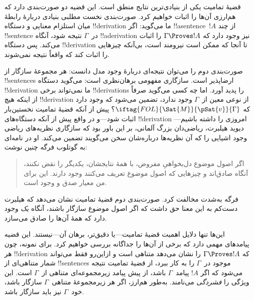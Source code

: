 \documentclass[../../../include/open-logic-section]{subfiles}
\begin{document}
      {}
      {}


قضیهٔ تمامیت یکی از بنیادی‌ترین نتایج منطق است. این قضیه دو صورت‌بندی
دارد که هم‌ارزی آن‌ها را اثبات خواهیم کرد. صورت‌بندی نخست مطلبی بنیادی
دربارهٔ رابطهٔ میان استلزام معنایی و دستگاه !!{derivation} ما می‌گوید:
اگر !!a{sentence}~$!A$ از چند !!{sentence} در~$\Gamma$ نتیجه شود، آنگاه
!!a{derivation} نیز وجود دارد که $\Gamma \Proves !A$ را اثبات می‌کند.
پس دستگاه !!{derivation} تا آنجا که ممکن است نیرومند است، بی‌آنکه
چیزهایی را اثبات کند که واقعاً نتیجه نمی‌شوند.

صورت‌بندی دوم را می‌توان نتیجه‌ای دربارهٔ وجود مدل دانست: هر مجموعهٔ
سازگار از !!{sentence}s ارضاپذیر است. سازگاری مفهومی برهان‌نظری است:
می‌گوید دستگاه !!{derivation} ما نمی‌تواند برخی !!{derivation}s را
پدید آورد. اما چه کسی می‌گوید صرفاً از اینکه هیچ !!{derivation} از نوعی
معین از~$\Gamma$ وجود ندارد، تضمین می‌شود که
وجود دارد که $\iftag{FOL}{\Sat{M}}{\pSat{v}}{\Gamma}$؟ پیش از آنکه
قضیهٔ تمامیت نخستین‌بار اثبات شود---و در واقع پیش از آنکه دستگاه‌های
!!{derivation} امروزی را داشته باشیم---دیوید هیلبرت، ریاضی‌دان بزرگ
آلمانی، بر این باور بود که سازگاری نظریه‌های ریاضی وجود اشیایی را که
آن نظریه‌ها درباره‌شان سخن می‌گویند تضمین می‌کند. او در نامه‌ای به
گوتلوب فرگه چنین نوشت:
\begin{quote}
  اگر اصول موضوع دل‌بخواهیِ مفروض، با همهٔ نتایجشان، یکدیگر را نقض
  نکنند، آنگاه صادق‌اند و چیزهایی که اصول موضوع تعریف می‌کنند وجود
  دارند. این برای من معیار صدق و وجود است.
\end{quote}
فرگه به‌شدت مخالفت کرد. صورت‌بندی دوم قضیهٔ تمامیت نشان می‌دهد که هیلبرت
دست‌کم به این معنا حق داشت که اگر اصول موضوع سازگار باشند، آنگاه
\emph{یک}
 وجود دارد که همهٔ آن‌ها را
صادق می‌سازد.

این‌ها تنها دلایل اهمیت قضیهٔ تمامیت---یا دقیق‌تر، برهان آن---نیستند.
این قضیه پیامدهای مهمی دارد که برخی از آن‌ها را جداگانه بررسی خواهیم
کرد. برای نمونه، چون هر !!{derivation} که $\Gamma \Proves !A$ را نشان
می‌دهد متناهی است و ازاین‌رو فقط می‌تواند شمار متناهی‌ای از
!!{sentence}s موجود در~$\Gamma$ را به کار ببرد، از قضیهٔ تمامیت نتیجه
می‌شود که اگر $!A$ پیامد~$\Gamma$ باشد، از پیش پیامد زیرمجموعه‌ای متناهی
از~$\Gamma$ است. این ویژگی را \emph{فشردگی} می‌نامند. به‌طور هم‌ارز، اگر
هر زیرمجموعهٔ متناهی~$\Gamma$ سازگار باشد، خود~$\Gamma$ نیز باید سازگار
باشد.
\end{document}
